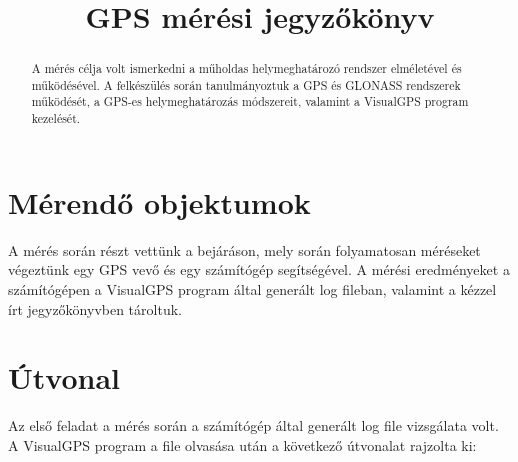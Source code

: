 \documentclass[10pt, conference,a4paper]{ITKproc}
\begin{document}
\title{GPS mérési jegyzőkönyv}
\author{
}


\maketitle

\begin{abstract}
A mérés célja volt ismerkedni a műholdas helymeghatározó rendszer elméletével és működésével. A felkészülés során tanulmányoztuk a GPS és GLONASS rendszerek működését, a GPS-es helymeghatározás módszereit, valamint a VisualGPS program kezelését. 
\end{abstract}

\IEEEpeerreviewmaketitle
\section{Mérendő objektumok}

A mérés során részt vettünk a bejáráson, mely során folyamatosan méréseket végeztünk egy GPS vevő és egy számítógép segítségével. A mérési eredményeket a számítógépen a VisualGPS program által generált log fileban, valamint a kézzel írt jegyzőkönyvben tároltuk.  

\section{Útvonal}
Az első feladat a mérés során a számítógép által generált log file vizsgálata volt. A VisualGPS program a file olvasása után a következő útvonalat rajzolta ki:
\end{document}
